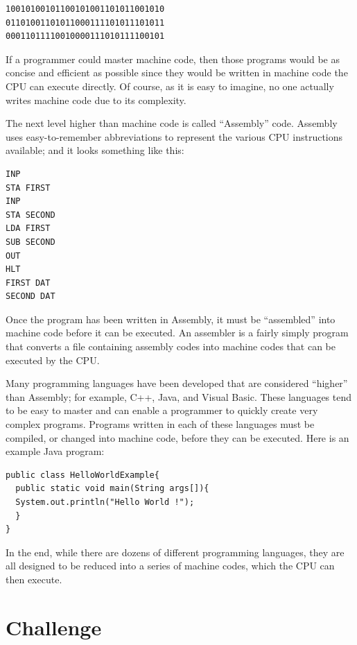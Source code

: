 \begin{Verbatim}[frame=lines,
xleftmargin=10mm,
xrightmargin=10mm]
10010100101100101001101011001010
01101001101011000111101011101011
00011011110010000111010111100101
\end{Verbatim}

If a programmer could master machine code, then those programs would be as concise and efficient as possible since they would be written in machine code the \ac{CPU} can execute directly. Of course, as it is easy to imagine, no one actually writes machine code due to its complexity.

The next level higher than machine code is called ``Assembly'' code. Assembly uses easy-to-remember abbreviations to represent the various \ac{CPU} instructions available; and it looks something like this: 

\begin{Verbatim}[frame=lines,
xleftmargin=10mm,
xrightmargin=10mm]
INP
STA FIRST 
INP
STA SECOND 
LDA FIRST 
SUB SECOND
OUT
HLT
FIRST DAT
SECOND DAT
\end{Verbatim}

Once the program has been written in Assembly, it must be ``assembled'' into machine code before it can be executed. An assembler is a fairly simply program that converts a file containing assembly codes into machine codes that can be executed by the \ac{CPU}.

Many programming languages have been developed that are considered ``higher'' than Assembly; for example, C++, Java, and Visual Basic. These languages tend to be easy to master and can enable a programmer to quickly create very complex programs. Programs written in each of these languages must be compiled, or changed into machine code, before they can be executed. Here is an example Java program:

\begin{Verbatim}[frame=lines,
xleftmargin=10mm,
xrightmargin=10mm]
public class HelloWorldExample{
  public static void main(String args[]){
  System.out.println("Hello World !"); 
  }
}
\end{Verbatim}

In the end, while there are dozens of different programming languages, they are all designed to be reduced into a series of machine codes, which the \ac{CPU} can then execute.

\section{Challenge}

